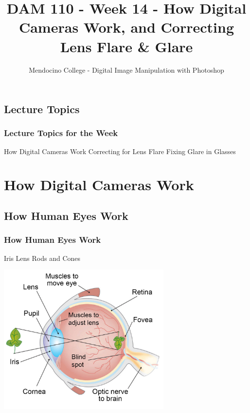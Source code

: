 \documentclass{beamer}
\title{DAM 110 - Week 14 - How Digital Cameras Work, and Correcting Lens Flare \& Glare}
\author{Mendocino College - Digital Image Manipulation with Photoshop}
\date{\vspace{-5em}}
\begin{document}
	{
		\begin{frame}
			\vspace{-35pt}
			\maketitle
		\end{frame}
	}

	\section{}
			\subsection{Lecture Topics}		
	\begin{frame}
		\frametitle{Lecture Topics for the Week}
				\begin{outline}
					\1 How Digital Cameras Work
					\1 Correcting for Lens Flare
					\1 Fixing Glare in Glasses
				\end{outline}
		\end{frame}

	\section{How Digital Cameras Work}
			\subsection{How Human Eyes Work}		
				\begin{frame}
					\frametitle{How Human Eyes Work}
					\begin{outline}
						\1 Iris
						\1 Lens
						\1 Rods and Cones
					\end{outline}
				\begin{center}
					\includegraphics[width=0.65\textwidth]{images/eye-anatomy-1000.jpg}
				\end{center}
				\end{frame}
\end{document}

